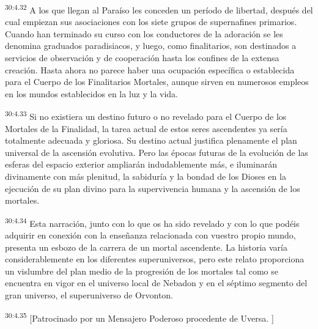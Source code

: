 \par
\textsuperscript{30:4.32} A los que llegan al Paraíso les conceden un período de libertad, después del cual empiezan sus asociaciones con los siete grupos de supernafines primarios. Cuando han terminado su curso con los conductores de la adoración se les denomina graduados paradisiacos, y luego, como finalitarios, son destinados a servicios de observación y de cooperación hasta los confines de la extensa creación. Hasta ahora no parece haber una ocupación específica o establecida para el Cuerpo de los Finalitarios Mortales, aunque sirven en numerosos empleos en los mundos establecidos en la luz y la vida.

\par
\textsuperscript{30:4.33} Si no existiera un destino futuro o no revelado para el Cuerpo de los Mortales de la Finalidad, la tarea actual de estos seres ascendentes ya sería totalmente adecuada y gloriosa. Su destino actual justifica plenamente el plan universal de la ascensión evolutiva. Pero las épocas futuras de la evolución de las esferas del espacio exterior ampliarán indudablemente más, e iluminarán divinamente con más plenitud, la sabiduría y la bondad de los Dioses en la ejecución de su plan divino para la supervivencia humana y la ascensión de los mortales.

\par
\textsuperscript{30:4.34} Esta narración, junto con lo que os ha sido revelado y con lo que podéis adquirir en conexión con la enseñanza relacionada con vuestro propio mundo, presenta un esbozo de la carrera de un mortal ascendente. La historia varía considerablemente en los diferentes superuniversos, pero este relato proporciona un vislumbre del plan medio de la progresión de los mortales tal como se encuentra en vigor en el universo local de Nebadon y en el séptimo segmento del gran universo, el superuniverso de Orvonton.

\par
\textsuperscript{30:4.35} [Patrocinado por un Mensajero Poderoso procedente de Uversa. ]